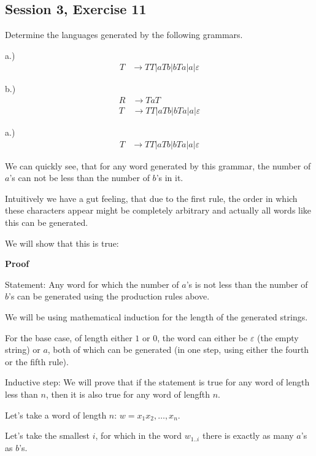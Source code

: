 \subsection{Session 3, Exercise 11}


Determine the languages generated by the following grammars.

a.)
\begin{align*}
T &\rightarrow TT | aTb | bTa | a | \varepsilon
\end{align*}

b.)
\begin{align*}
R &\rightarrow TaT\\
T &\rightarrow TT | aTb | bTa | a | \varepsilon
\end{align*}


a.)
\begin{align*}
T &\rightarrow TT | aTb | bTa | a | \varepsilon
\end{align*}

We can quickly see, that for any word generated by this grammar, the number of $a$'s can not be less than the number of $b$'s in it.

Intuitively we have a gut feeling, that due to the first rule, the order in which these characters appear might be completely arbitrary and actually all words like this can be generated.

We will show that this is true:

\textbf{Proof}

Statement: Any word for which the number of $a$'s is not less than the number of $b$'s can be generated using the production rules above.

We will be using mathematical induction for the length of the generated strings.

For the base case, of length either $1$ or $0$, the word can either be $\varepsilon$ (the empty string) or $a$, both of which can be generated (in one step, using either the fourth or the fifth rule).

Inductive step: We will prove that if the statement is true for any word of length less than $n$, then it is also true for any word of lengfth $n$.

Let's take a word of length $n$: $w = x_1x_2,\dots,x_n$.

Let's take the smallest $i$, for which in the word $w_{1..i}$ there is exactly as many $a$'s as $b$'s.

